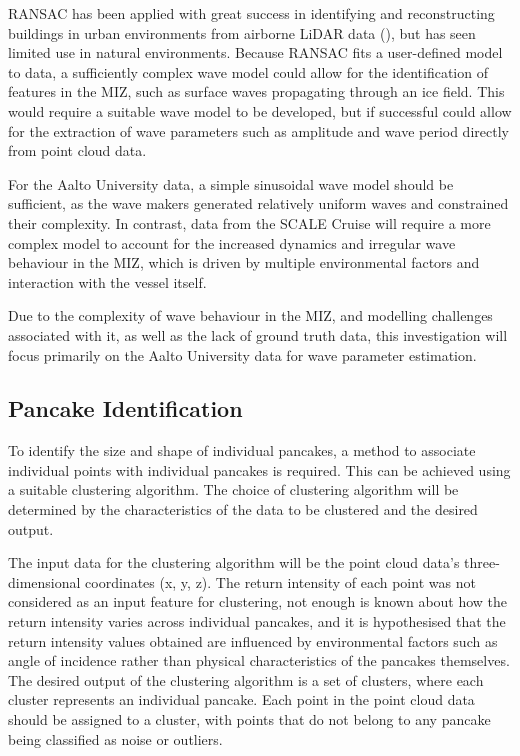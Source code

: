 \ac{RANSAC} has been applied with great success in identifying and reconstructing buildings in urban environments from airborne \ac{LiDAR} data (\cite{forlaniBuildingReconstructionVisualization2003}), but has seen limited use in natural environments. Because \ac{RANSAC} fits a user-defined model to data, a sufficiently complex wave model could allow for the identification of features in the \ac{MIZ}, such as surface waves propagating through an ice field. This would require a suitable wave model to be developed, but if successful could allow for the extraction of wave parameters such as amplitude and wave period directly from point cloud data.

For the Aalto University data, a simple sinusoidal wave model should be sufficient, as the wave makers generated relatively uniform waves and constrained their complexity. In contrast, data from the \ac{SCALE} Cruise will require a more complex model to account for the increased dynamics and irregular wave behaviour in the \ac{MIZ}, which is driven by multiple environmental factors and interaction with the vessel itself.

Due to the complexity of wave behaviour in the \ac{MIZ}, and modelling challenges associated with it, as well as the lack of ground truth data, this investigation will focus primarily on the Aalto University data for wave parameter estimation.

\subsection{Pancake Identification}
\label{subsec:ch5.section3.subsec4}

To identify the size and shape of individual pancakes, a method to associate individual points with individual pancakes is required. This can be achieved using a suitable clustering algorithm. The choice of clustering algorithm will be determined by the characteristics of the data to be clustered and the desired output.

The input data for the clustering algorithm will be the point cloud data's three-dimensional coordinates (x, y, z). The return intensity of each point was not considered as an input feature for clustering, not enough is known about how the return intensity varies across individual pancakes, and it is hypothesised that the return intensity values obtained are influenced by environmental factors such as angle of incidence rather than physical characteristics of the pancakes themselves. The desired output of the clustering algorithm is a set of clusters, where each cluster represents an individual pancake. Each point in the point cloud data should be assigned to a cluster, with points that do not belong to any pancake being classified as noise or outliers.

